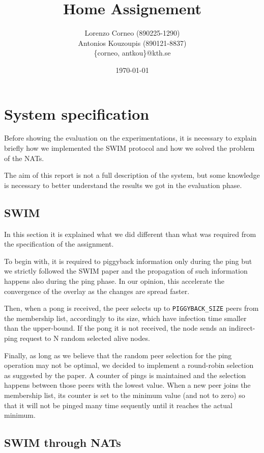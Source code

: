 \documentclass[10pt,a4paper]{article}
\begin{document}
\title{Home Assignement}
\author{Lorenzo Corneo (890225-1290) \\ Antonios Kouzoupis (890121-8837)\\
	\{corneo, antkou\}@kth.se}
\date{\today}
\maketitle

\section{System specification}
Before showing the evaluation on the experimentations, it is necessary to explain briefly how we implemented the SWIM protocol and how we solved the problem of the NATs. 

The aim of this report is not a full description of the system, but some knowledge is necessary to better understand the results we got in the evaluation phase.

\subsection{SWIM}
In this section it is explained what we did different than what was required from the specification of the assignment.

To begin with, it is required to piggyback information only during the ping but we strictly followed the SWIM paper and the propagation of such information happens also during the ping phase. In our opinion, this accelerate the convergence of the overlay as the changes are spread faster.

Then, when a pong is received, the peer selects up to \texttt{PIGGYBACK\_SIZE} peers from the membership list, accordingly to its size, which have infection time smaller than the upper-bound. If the pong it is not received, the node sends an indirect-ping request to N random selected alive nodes.

Finally, as long as we believe that the random peer selection for the ping operation may not be optimal, we decided to implement a round-robin selection as suggested by the paper. A counter of pings is maintained and the selection happens between those peers with the lowest value. When a new peer joins the membership list, its counter is set to the minimum value (and not to zero) so that it will not be pinged many time sequently until it reaches the actual minimum.

\subsection{SWIM through NATs}
\end{document}
